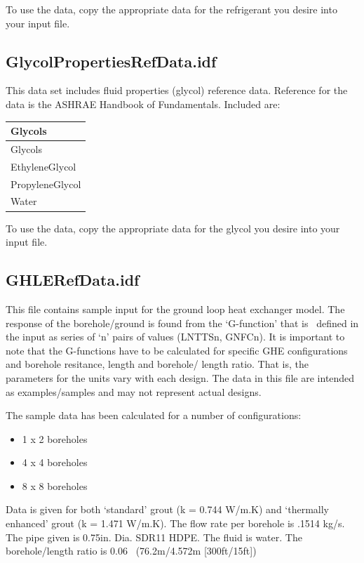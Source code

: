 To use the data, copy the appropriate data for the refrigerant you desire into your input file.

\subsection{GlycolPropertiesRefData.idf}\label{glycolpropertiesrefdata.idf}

This data set includes fluid properties (glycol) reference data. Reference for the data is the ASHRAE Handbook of Fundamentals. Included are:

\begin{longtable}[c]{@{}l@{}}
\toprule
Glycols \tabularnewline
\midrule
\endfirsthead

\toprule
Glycols \tabularnewline
\midrule
\endhead

EthyleneGlycol \tabularnewline
PropyleneGlycol \tabularnewline
Water \tabularnewline
\bottomrule
\end{longtable}

To use the data, copy the appropriate data for the glycol you desire into your input file.

\subsection{GHLERefData.idf}\label{ghlerefdata.idf}

This file contains sample input for the ground loop heat exchanger model. The response of the borehole/ground is found from the `G-function' that is~ defined in the input as series of `n' pairs of values (LNTTSn, GNFCn). It is important to note that the G-functions have to be calculated for specific GHE configurations and borehole resitance, length and borehole/ length ratio. That is, the parameters for the units vary with each design. The data in this file are intended as examples/samples and may not represent actual designs.

The sample data has been calculated for a number of configurations:

\begin{itemize}
\tightlist
\item
  1 x 2 boreholes
\item
  4 x 4 boreholes
\item
  8 x 8 boreholes
\end{itemize}

Data is given for both `standard' grout (k = 0.744 W/m.K) and `thermally enhanced' grout (k = 1.471 W/m.K). The flow rate per borehole is .1514 kg/s. The pipe given is 0.75in. Dia. SDR11 HDPE. The fluid is water. The borehole/length ratio is 0.06~ (76.2m/4.572m {[}300ft/15ft{]})

